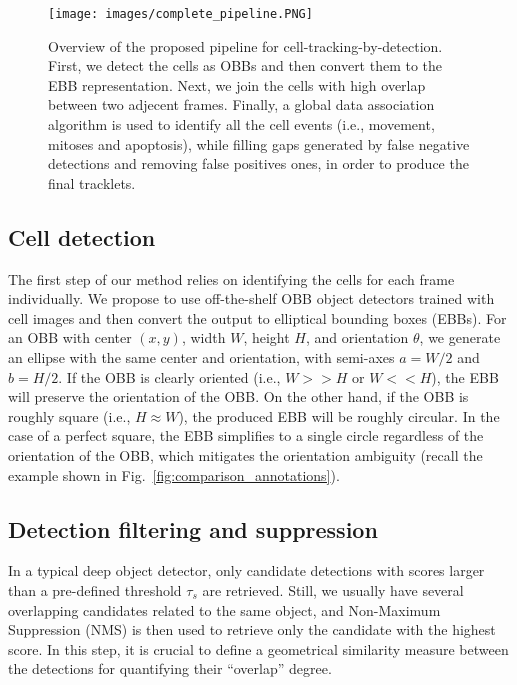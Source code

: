 \documentclass{article}
\begin{document}
\begin{figure*}[]
    \centering
    \texttt{[image: images/complete\_pipeline.PNG]}
    \caption[Overview of the proposed pipeline for cell-tracking-by-detection.]{Overview of the proposed pipeline for cell-tracking-by-detection. First, we detect the cells as OBBs and then convert them to the EBB representation. Next, we join the cells with high overlap between two adjecent frames. Finally, a global data association algorithm is used to identify all the cell events (i.e., movement, mitoses and apoptosis), while filling gaps generated by false negative detections and removing false positives ones, in order to produce the final tracklets.}
    \label{fig:complete_pipeline}
\end{figure*}

\subsection{Cell detection}

The first step of our method relies on identifying the cells for each frame individually. 
We propose to use off-the-shelf OBB object detectors trained with cell images and then convert the output to elliptical bounding boxes (EBBs). For an OBB with center $(x,y)$, width $W$, height $H$, and orientation $\theta$, we generate an ellipse with the same center and orientation, with semi-axes $a=W/2$ and $b=H/2$. If the OBB is clearly oriented (i.e., $W >\!\!> H$ or $W <\!\!< H$), the EBB will preserve the orientation of the OBB. On the other hand, if the OBB is roughly square (i.e., $H\approx W$), the produced EBB will be roughly circular. In the case of a perfect square, the EBB simplifies to a single circle regardless of the orientation of the OBB, which mitigates the orientation ambiguity (recall the example shown in Fig.~\ref{fig:comparison_annotations}).


\subsection{Detection filtering and suppression}
\label{sec:detection_filtering}

In a typical deep object detector, only candidate detections with scores larger than a pre-defined threshold $\tau_s$ are retrieved. Still, we usually have several overlapping candidates related to the same object, and Non-Maximum Suppression (NMS) is then used to retrieve only the candidate with the highest score. In this step, it is crucial to define a geometrical similarity measure between the detections for quantifying their ``overlap'' degree. 
\end{document}
